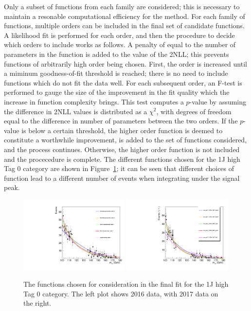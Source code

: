 Only a subset of functions from each family are considered;
this is necessary to maintain a resonable computational efficiency for the method.
For each family of functions, multiple orders can be included in the final set of candidate functions.
A likelihood fit is performed for each order, 
and then the procedure to decide which orders to include works as follows.
A penalty of equal to the number of parameters in the function is added to the value of the 2NLL;
this prevents functions of arbitrarily high order being chosen.
First, the order is increased until a miminum goodness-of-fit threshold is reached;
there is no need to include functions which do not fit the data well. %
For each subsequent order, an F-test \cite{Fisher} is performed to gauge the size of the improvement in the fit
quality which the increase in function complexity brings.
This test computes a $p$-value by assuming the difference in 2NLL values 
is distributed as a $\chi^2$, with degrees of freedom equal to 
the difference in number of parameters between the two orders.
If the $p$-value is below a certain threshold, %
the higher order function is deemed to constitute a worthwhile improvement, 
is added to the set of functions considered, and the process continues.
Otherwise, the higher order function is not included and the procecedure is complete.
The different functions chosen for the 1J high Tag 0 category 
are shown in Figure~\ref{fig:sigbkg_functions};
it can be seen that different choices of function lead to a different number of events 
when integrating under the signal peak.

\begin{figure}[hptb]
\centering
\includegraphics[width=0.49\textwidth]{Figures/SigBkg/allPdfs_RECO_1J_PTH_120_200_Tag0_2016.pdf}
\includegraphics[width=0.49\textwidth]{Figures/SigBkg/allPdfs_RECO_1J_PTH_120_200_Tag0_2017.pdf}
\caption{
The functions chosen for consideration in the final fit for the 1J high Tag 0 category.
The left plot shows 2016 data, with 2017 data on the right.
}
\label{fig:sigbkg_functions}
\end{figure}

